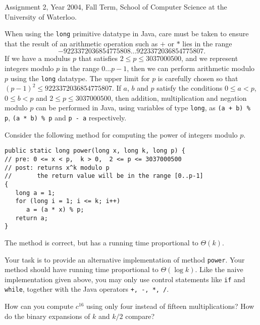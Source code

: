 \begin{usage}
Assignment 2, Year 2004, Fall Term, School of Computer Science at the University of Waterloo.
\end{usage}

When using the {\tt long} primitive datatype in Java, care must be taken
to ensure that the result of an arithmetic operation such as $+$ or $\ast$
lies in the range
$$-9223372036854775808\ldots 9223372036854775807.$$
If we have a modulus $p$
that satisfies $2\leq p \leq 3037000500$, and we represent integers modulo
$p$ in the range $0\ldots p-1$, then we can perform arithmetic modulo
$p$ using the {\tt long} datatype.  The upper limit for $p$ is carefully
chosen so that $(p-1)^2 \leq 9223372036854775807$.  If $a$, $b$
and $p$ satisfy the conditions $0 \leq a <
p$, $0 \leq b < p$ and $2 \leq p \leq 3037000500$, then
addition, multiplication and negation modulo $p$
can be performed in Java, using variables of type {\tt long},
as \verb[(a + b) % p[, \verb[(a * b) % p[ and \verb[p - a[ respectively.

\medskip

Consider the following method for computing the power of integers
modulo $p$.
\begin{verbatim}
public static long power(long x, long k, long p) {
// pre: 0 <= x < p,  k > 0,  2 <= p <= 3037000500
// post: returns x^k modulo p
//       the return value will be in the range [0..p-1]
{
   long a = 1;
   for (long i = 1; i <= k; i++)
      a = (a * x) % p;
   return a;
}
\end{verbatim}
The method is correct, but has a running time proportional to $\Theta(k)$.

\medskip

Your task is to provide an alternative implementation of method
{\tt power}.  Your method should have running time proportional to
$\Theta(\log k)$.
%
Like the naive implementation given above, you may only use control
statements like {\tt if} and {\tt while}, together with the Java
operators \verb[+, -, *, /[.


\begin{hint}
How can you compute $c^{16}$ using only four instead of fifteen
multiplications?  How do the binary expansions of $k$ and $k/2$ compare?
\end{hint}

